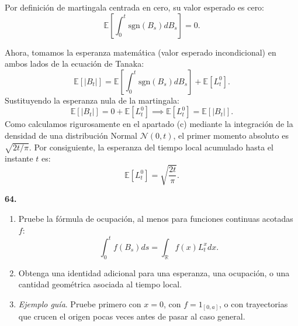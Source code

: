 \documentclass[11pt, letterpaper]{article}
\begin{document}
\begin{solucion}
    Por definición de martingala centrada en cero, su valor esperado es cero:
    \[ \mathbb{E}\left[ \int_0^t \text{sgn}(B_s) dB_s \right] = 0. \]
    
    Ahora, tomamos la esperanza matemática (valor esperado incondicional) en ambos lados de la ecuación de Tanaka:
    \[ \mathbb{E}[|B_t|] = \mathbb{E}\left[ \int_0^t \text{sgn}(B_s) dB_s \right] + \mathbb{E}[L_t^0]. \]
    Sustituyendo la esperanza nula de la martingala:
    \[ \mathbb{E}[|B_t|] = 0 + \mathbb{E}[L_t^0] \implies \mathbb{E}[L_t^0] = \mathbb{E}[|B_t|]. \]
    Como calculamos rigurosamente en el apartado (c) mediante la integración de la densidad de una distribución Normal $\mathcal{N}(0, t)$, el primer momento absoluto es $\sqrt{2t/\pi}$.
    Por consiguiente, la esperanza del tiempo local acumulado hasta el instante $t$ es:
    \[ \mathbb{E}[L_t^0] = \sqrt{\frac{2t}{\pi}}. \]
\end{solucion}

\newpage

\begin{ejercicio}
    \textbf{64.} 
    \begin{enumerate}
        \item Pruebe la fórmula de ocupación, al menos para funciones continuas acotadas $f$:
        \[ \int_{0}^{t}f(B_{s})ds=\int_{\mathbb{R}}f(x)L_{t}^{x}dx. \]
        \item Obtenga una identidad adicional para una esperanza, una ocupación, o una cantidad geométrica asociada al tiempo local.
        \item \textit{Ejemplo guía}. Pruebe primero con $x=0$, con $f=1_{[0,a]}$, o con trayectorias que crucen el origen pocas veces antes de pasar al caso general.
    \end{enumerate}
\end{ejercicio}

\vspace{5mm}
\end{document}
